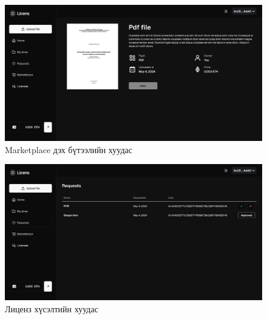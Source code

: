 \begin{figure}[h!]
	\centering
	\includegraphics[scale=0.16]{src/images/marketplace-file.png}
	\caption{Marketplace дэх бүтээлийн хуудас}
\end{figure}

\begin{figure}[h!]
	\centering
	\includegraphics[scale=0.16]{src/images/requests.png}
	\caption{Лиценз хүсэлтийн  хуудас}
\end{figure}